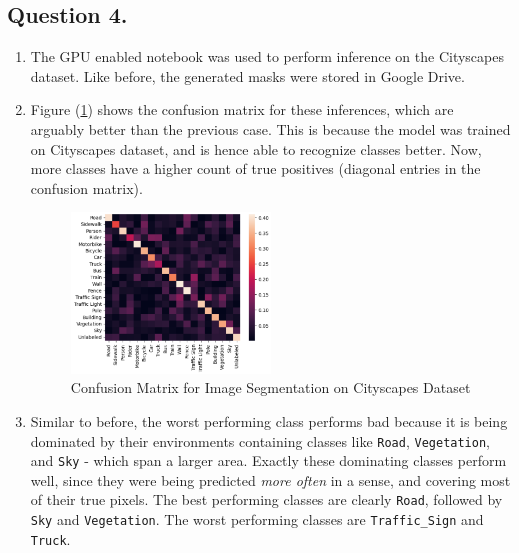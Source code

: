 \documentclass[10pt]{article}
\begin{document}
    \subsection*{\textbf{Question 4.}}
    \begin{enumerate}[label=(\alph*)]
        \item The GPU enabled notebook was used to perform inference on the Cityscapes dataset. Like before,
        the generated masks were stored in Google Drive.
        \item Figure (\ref{fig:deeplab-2-conf-matrix}) shows the confusion matrix for these inferences, which are arguably better
        than the previous case. This is because the model was trained on Cityscapes dataset, and is hence able
        to recognize classes better. Now, more classes have a higher count of true positives (diagonal entries
        in the confusion matrix).
        \begin{figure}[h!]
            \centering
            \includegraphics[width=0.5\textwidth]{Assets/Segmentation/Metrics/06}
            \caption{Confusion Matrix for Image Segmentation on Cityscapes Dataset}
            \label{fig:deeplab-2-conf-matrix}
        \end{figure}
        \item Similar to before, the worst performing class performs bad because it is being dominated by
        their environments containing classes like \texttt{Road}, \texttt{Vegetation}, and \texttt{Sky} -
        which span a larger area. Exactly these dominating classes perform well, since they were being predicted
        \textit{more often} in a sense, and covering most of their true pixels. The best performing classes are
        clearly \texttt{Road}, followed by \texttt{Sky} and \texttt{Vegetation}. The worst performing
        classes are \texttt{Traffic\_Sign} and \texttt{Truck}.
    \end{enumerate}
\end{document}
